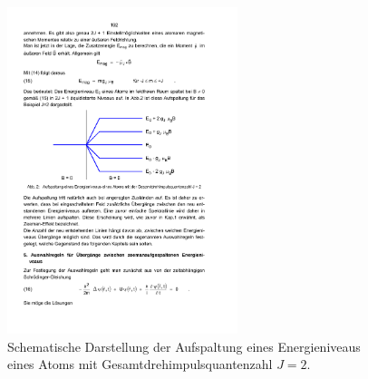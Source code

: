 \documentclass[
  bibliography=totoc,     %
  captions=tableheading,  %
  titlepage=firstiscover, %
]{scrartcl}
\begin{document}
\begin{figure}
    \centering
    \includegraphics[width=0.6\textwidth]{aufspaltung.pdf}
    \caption{Schematische Darstellung der Aufspaltung eines Energieniveaus eines Atoms mit Gesamtdrehimpulsquantenzahl $J=2$.\cite{V27}}
    \label{fig:aufspaltung}
\end{figure}
%
\end{document}
